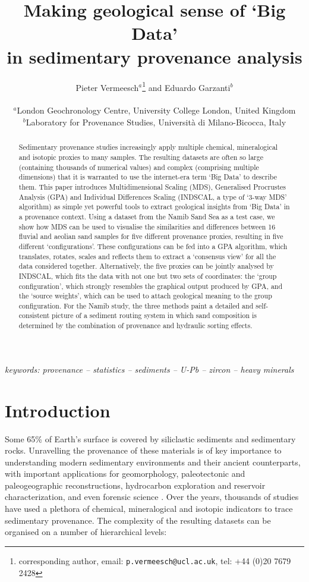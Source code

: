 \documentclass{article}
\title{Making geological sense of `Big Data'\\in sedimentary provenance analysis}
\author{Pieter Vermeesch$^a$\footnote{corresponding author, email: {\tt p.vermeesch@ucl.ac.uk}, tel: +44 (0)20 7679 2428} and Eduardo Garzanti$^b$\\~\\
${}^a$London Geochronology Centre, University College London, United Kingdom\\
${}^b$Laboratory for Provenance Studies, Universit\`{a} di Milano-Bicocca, Italy}
\date{}
\begin{document}

\maketitle

\begin{abstract}
Sedimentary provenance studies increasingly apply multiple chemical,
mineralogical and isotopic proxies to many samples.  The resulting
datasets are often so large (containing thousands of numerical values)
and complex (comprising multiple dimensions) that it is warranted to
use the internet-era term `Big Data' to describe them. This paper
introduces Multidimensional Scaling (MDS), Generalised Procrustes
Analysis (GPA) and Individual Differences Scaling (INDSCAL, a type of
`3-way MDS' algorithm) as simple yet powerful tools to extract
geological insights from `Big Data' in a provenance context.  Using a
dataset from the Namib Sand Sea as a test case, we show how MDS can be
used to visualise the similarities and differences between 16 fluvial
and aeolian sand samples for five different provenance proxies,
resulting in five different `configurations'.  These configurations
can be fed into a GPA algorithm, which translates, rotates, scales and
reflects them to extract a `consensus view' for all the data
considered together. Alternatively, the five proxies can be jointly
analysed by INDSCAL, which fits the data with not one but two sets of
coordinates: the `group configuration', which strongly resembles the
graphical output produced by GPA, and the `source weights', which can
be used to attach geological meaning to the group configuration. For
the Namib study, the three methods paint a detailed and
self-consistent picture of a sediment routing system in which sand
composition is determined by the combination of provenance and
hydraulic sorting effects.
\end{abstract}
\begin{center}
\emph{keywords: provenance -- statistics -- sediments -- U-Pb -- zircon -- heavy minerals}
\end{center}
\section{Introduction}
\label{sec:intro}

Some 65\% of Earth's surface is covered by siliclastic sediments and
sedimentary rocks. Unravelling the provenance of these materials is of
key importance to understanding modern sedimentary environments and
their ancient counterparts, with important applications for
geomorphology, paleotectonic and paleogeographic reconstructions,
hydrocarbon exploration and reservoir characterization, and even
forensic science \citep[e.g.,][]{pye2007, vermeesch2010b,
  garzanti2012, garzanti2014b, garzanti2014c, stevens2013, nie2014,
  scott2014}.  Over the years, thousands of studies have used a
plethora of chemical, mineralogical and isotopic indicators to trace
sedimentary provenance. The complexity of the resulting datasets can
be organised on a number of hierarchical levels:
\end{document}
